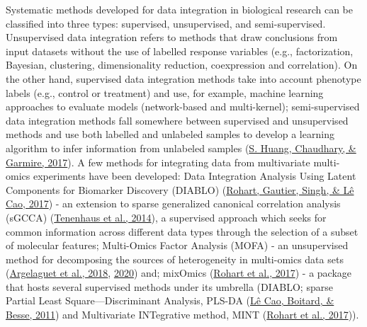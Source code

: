 \documentclass[12pt,twoside]{reedthesis}
\begin{document}
Systematic methods developed for data integration in biological research
can be classified into three types: supervised, unsupervised, and
semi-supervised. Unsupervised data integration refers to methods that
draw conclusions from input datasets without the use of labelled
response variables (e.g., factorization, Bayesian, clustering,
dimensionality reduction, coexpression and correlation). On the other
hand, supervised data integration methods take into account phenotype
labels (e.g., control or treatment) and use, for example, machine
learning approaches to evaluate models (network-based and multi-kernel);
semi-supervised data integration methods fall somewhere between
supervised and unsupervised methods and use both labelled and unlabeled
samples to develop a learning algorithm to infer information from
unlabeled samples (\protect\hyperlink{ref-huang2017}{S. Huang, Chaudhary, \& Garmire, 2017}). A few methods for integrating data from
multivariate multi-omics experiments have been developed: Data
Integration Analysis Using Latent Components for Biomarker Discovery
(DIABLO) (\protect\hyperlink{ref-rohart2017}{Rohart, Gautier, Singh, \& Lê Cao, 2017}) - an extension to sparse generalized canonical
correlation analysis (sGCCA) (\protect\hyperlink{ref-tenenhaus2014}{Tenenhaus et al., 2014}), a supervised approach
which seeks for common information across different data types through
the selection of a subset of molecular features; Multi-Omics Factor
Analysis (MOFA) - an unsupervised method for decomposing the sources of
heterogeneity in multi-omics data sets (\protect\hyperlink{ref-argelaguet2018}{Argelaguet et al., 2018}, \protect\hyperlink{ref-argelaguet2020}{2020}) and; mixOmics (\protect\hyperlink{ref-rohart2017}{Rohart et al., 2017}) - a package that hosts
several supervised methods under its umbrella (DIABLO; sparse Partial
Least Square---Discriminant Analysis, PLS-DA (\protect\hyperlink{ref-luxeacao2011}{Lê Cao, Boitard, \& Besse, 2011}) and
Multivariate INTegrative method, MINT (\protect\hyperlink{ref-rohart2017}{Rohart et al., 2017})).
\end{document}
